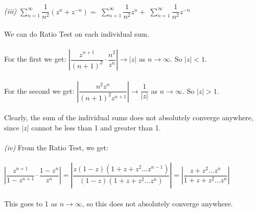 \begin{enumerate}
\\\\
\textit{(iii)}
$\displaystyle\sum\limits_{n=1}^\infty \dfrac{1}{n^2}(z^n+z^{-n}) = $
$\displaystyle\sum\limits_{n=1}^\infty \dfrac{1}{n^2}z^n + $
$\displaystyle\sum\limits_{n=1}^\infty \dfrac{1}{n^2}z^{-n} $ \\\\
We can do Ratio Test on each individual sum.\\\\
For the first we get:
$\left|\dfrac{z^{n+1}}{(n+1)^2}\cdot\dfrac{n^2}{z^{n}}\right|
\rightarrow |z|$ as $n\rightarrow\infty$. So $|z| < 1$. \\\\
For the second we get:
$\left|\dfrac{n^2z^n}{(n+1)^{2}z^{n+1}}\right|
\rightarrow \dfrac{1}{|z|}$ as $n\rightarrow\infty$. So $|z| > 1$. \\\\
Clearly, the sum of the individual sums does not absolutely converge anywhere, since $|z|$ cannot be less than 1 and greater than 1. 
\\\\
\textit{(iv)}
From the Ratio Test, we get:\\\\
$\left|\dfrac{z^{n+1}}{1-z^{n+1}}\cdot\dfrac{1-z^{n}}{z^{n}}\right| =
\left|\dfrac{z(1-z)(1+z+z^2...z^{n-1})}{(1-z)(1+z+z^2...z^{n})}\right| =
\left|\dfrac{z+z^2...z^{n}}{1+z+z^2...z^{n}}\right|$ \\\\
This goes to 1 as $n\rightarrow\infty$, so this does not absolutely converge anywhere.
\end{enumerate}